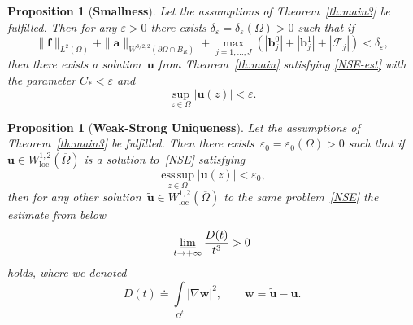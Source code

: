\documentclass[11pt]{article}
\newtheorem{proposition}[theorem]{Proposition}
\numberwithin{equation}{section}
\numberwithin{figure}{section}
\newcommand{\esssup}{\mathop{\mathrm{ess\,sup}}}
\def\loc{{\mathrm{loc}}}
\def\Fe{{\mathcal F}}
\def\ue{{\mathbf u}}
\def\fe{{\mathbf f}}
\def\be{{\mathbf b}}
\def\we{{\mathbf w}}
\def\ae{{\mathbf a}}
\def\e{{\varepsilon}}
\def\fe{{\mathbf f}}
\begin{document}
\begin{proposition}[{\bf Smallness}]\label{th:main4} Let the assumptions of Theorem~\ref{th:main3} be fulfilled. Then for any $\e>0$
there exists $\delta_{\e}=\delta_{\e}(\Omega)>0$ such that if
		\begin{equation}  \label{uni-21}
			\|\fe\|_{L^2(\Omega)}+\|\ae\|_{W^{3/2,2}(\partial\Omega \cap B_{R})}+\max\limits_{j=1,\dots,J}\left( |\be_j^0|
+|\be_j^1|+ |\Fe_j| \right)<\delta_\e ,
		\end{equation}
		then there exists a solution~$\ue$ from Theorem~\ref{th:main} satisfying \eqref{NSE-est} with the parameter $C_*<\e$ and
		\begin{equation}  \label{uni-22}
			\sup\limits_{z\in\Omega}|\ue(z)|<\e.
		\end{equation}
\end{proposition}

\begin{proposition}[{\bf Weak-Strong Uniqueness}]\label{th:main5} Let the assumptions of Theorem~\ref{th:main3} be fulfilled. Then there exists~$\e_0=\e_0(\Omega)>0$ such that if $\ue\in W^{1,2}_\loc(\overline\Omega)$ is a solution to~\eqref{NSE} satisfying
		\begin{equation}  \label{uni-23}
			\esssup\limits_{z\in\Omega}|\ue(z)|<\e_0,\end{equation}
		then for any other
		solution~$\tilde\ue\in W^{1,2}_\loc(\overline{\Omega})$ to the same problem~\eqref{NSE} the estimate from below
		\begin{equation}  \label{uni-25}
			\varliminf\limits_{t\to+\infty}\frac{D(t)}{t^3}>0
		\end{equation}
		holds, where we denoted 
		\begin{equation}  \label{uni-26}
			D(t)\doteq\int\limits_{\Omega^t}|\nabla\we|^2,\qquad \we=\tilde\ue-\ue.
		\end{equation}
\end{proposition}
\end{document}
